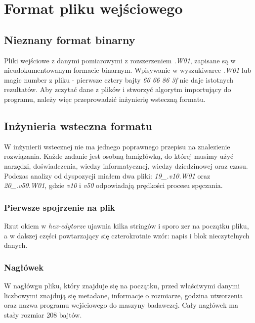 \documentclass{article}
\begin{document}
	
	
	\pagebreak
	
	
	\section{Format pliku wejściowego}
	\subsection{Nieznany format binarny}
	Pliki wejściowe z danymi pomiarowymi z rozszerzeniem \textit{.W01}, zapisane są w nieudokumentowanym formacie binarnym. Wpisywanie w wyszukiwarce \textit{.W01} lub magic number z pliku - pierwsze cztery bajty \textit{66 66 86 3f} nie daje istotnych rezultatów. Aby zczytać dane z plików i stworzyć algorytm importujący do programu, należy więc przeprowadzić inżynierię wsteczną formatu.
	
	\subsection{Inżynieria wsteczna formatu}
	W inżynierii wstecznej nie ma jednego poprawnego przepisu na znalezienie rozwiązania. Każde zadanie jest osobną łamigłówką, do której musimy użyć narzędzi, doświadczenia, wiedzy informatycznej, wiedzy dziedzinowej oraz czasu.
	Podczas analizy od dyspozycji miałem dwa pliki: \textit{19\_.v10.W01} oraz \textit{20\_.v50.W01}, gdzie \textit{v10} i \textit{v50} odpowiadają prędkości procesu spęczania.
	
	\subsubsection{Pierwsze spojrzenie na plik}
	Rzut okiem w \textit{hex-edytorze} ujawnia kilka stringów i sporo zer na początku pliku, a w dalszej części powtarzający się czterokrotnie wzór: napis i blok nieczytelnych danych.
	
	\subsubsection{Nagłówek}
	W nagłówgu pliku, który znajduje się na początku, przed właściwymi danymi liczbowymi znajdują się metadane, informacje o rozmiarze, godzina utworzenia oraz nazwa programu wejściowego do maszyny badawczej. Cały nagłówek ma stały rozmiar 208 bajtów.
	
\end{document}

